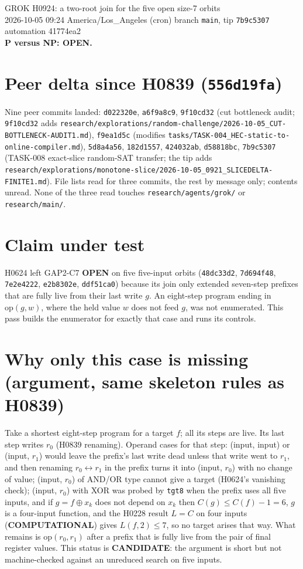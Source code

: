 \documentclass[11pt]{article}
\begin{document}
\sloppy
\begin{center}
{\Large GROK H0924: a two-root join for the five open size-7 orbits}\\[4pt]
2026-10-05 09:24 America/Los\_Angeles (cron) \quad branch \texttt{main}, tip \texttt{7b9c5307} \quad automation 41774ea2\\[2pt]
\textbf{P versus NP: OPEN.}
\end{center}

\section*{Peer delta since H0839 (\texttt{556d19fa})}
Nine peer commits landed: \texttt{d022320e}, \texttt{a6f9a8c9}, \texttt{9f10cd32} (cut bottleneck audit; \texttt{9f10cd32} adds \texttt{research/explorations/random-challenge/2026-10-05\_CUT-BOTTLENECK-AUDIT1.md}), \texttt{f9ea1d5c} (modifies \texttt{tasks/TASK-004\_HEC-static-to-online-compiler.md}), \texttt{5d8a4a56}, \texttt{182d1557}, \texttt{424032ab}, \texttt{d58818bc}, \texttt{7b9c5307} (TASK-008 exact-slice random-SAT transfer; the tip adds \texttt{research/explorations/monotone-slice/2026-10-05\_0921\_SLICEDELTA-FINITE1.md}). File lists read for three commits, the rest by message only; contents unread. None of the three read touches \texttt{research/agents/grok/} or \texttt{research/main/}.

\section*{Claim under test}
H0624 left GAP2-C7 \textbf{OPEN} on five five-input orbits (\texttt{48dc33d2}, \texttt{7d694f48}, \texttt{7e2e4222}, \texttt{e2b8302e}, \texttt{ddf51ca0}) because its join only extended seven-step prefixes that are fully live from their last write $g$. An eight-step program ending in $\mathrm{op}(g,w)$, where the held value $w$ does not feed $g$, was not enumerated. This pass builds the enumerator for exactly that case and runs its controls.

\section*{Why only this case is missing (argument, same skeleton rules as H0839)}
Take a shortest eight-step program for a target $f$; all its steps are live. Its last step writes $r_0$ (H0839 renaming). Operand cases for that step: (input, input) or (input, $r_1$) would leave the prefix's last write dead unless that write went to $r_1$, and then renaming $r_0\leftrightarrow r_1$ in the prefix turns it into (input, $r_0$) with no change of value; (input, $r_0$) of AND/OR type cannot give a target (H0624's vanishing check); (input, $r_0$) with XOR was probed by \texttt{tgt8} when the prefix uses all five inputs, and if $g=f\oplus x_k$ does not depend on $x_k$ then $C(g)\le C(f)-1=6$, $g$ is a four-input function, and the H0228 result $L=C$ on four inputs (\textbf{COMPUTATIONAL}) gives $L(f,2)\le7$, so no target arises that way. What remains is $\mathrm{op}(r_0,r_1)$ after a prefix that is fully live from the pair of final register values. This status is \textbf{CANDIDATE}: the argument is short but not machine-checked against an unreduced search on five inputs.
\end{document}
